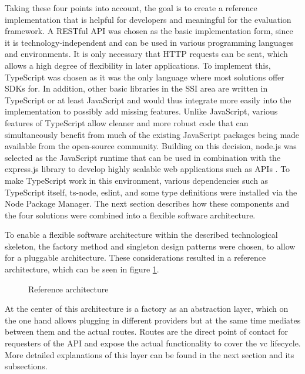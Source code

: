     Taking these four points into account, the goal is to create a reference implementation that is helpful for developers and meaningful for the evaluation framework. A RESTful API was chosen as the basic implementation form, since it is technology-independent and can be used in various programming languages and environments. It is only necessary that HTTP requests can be sent, which allows a high degree of flexibility in later applications. To implement this, TypeScript was chosen as it was the only language where most solutions offer SDKs for. In addition, other basic libraries in the \ac{SSI} area are written in TypeScript or at least JavaScript and would thus integrate more easily into the implementation to possibly add missing features. Unlike JavaScript, various features of TypeScript allow cleaner and more robust code \cite[p. 87]{zammetti_modern_2020} that can simultaneously benefit from much of the existing JavaScript packages being made available from the open-source community. Building on this decision, node.js was selected as the JavaScript runtime that can be used in combination with the express.js library to develop highly scalable web applications such as APIs \cite{openjs_foundation_about_2021, openjs_foundation_express_2021}. To make TypeScript work in this environment, various dependencies such as TypeScript itself, ts-node, eslint, and some type definitions were installed via the Node Package Manager. The next section describes how these components and the four solutions were combined into a flexible software architecture.
    
    To enable a flexible software architecture within the described technological skeleton, the factory method and singleton design patterns were chosen, to allow for a pluggable architecture. These considerations resulted in a reference architecture, which can be seen in figure \ref{figure: ref arch}.
    
    \begin{figure}[ht]
	    \centering    	    
	    \makebox[\textwidth]{}
        \caption{Reference architecture}
        \label{figure: ref arch}
    \end{figure}
    
    At the center of this architecture is a factory as an abstraction layer, which on the one hand allows plugging in different providers but at the same time mediates between them and the actual routes. Routes are the direct point of contact for requesters of the API and expose the actual functionality to cover the \ac{vc} lifecycle. More detailed explanations of this layer can be found in the next section and its subsections.

